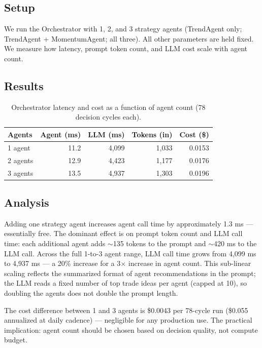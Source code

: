 \documentclass[10pt,conference]{IEEEtran}
\begin{document}
\subsection{Setup}

We run the Orchestrator with 1, 2, and 3 strategy agents (TrendAgent only; TrendAgent + MomentumAgent; all three). All other parameters are held fixed. We measure how latency, prompt token count, and LLM cost scale with agent count.

\subsection{Results}

\begin{table}[h]
    \centering
    \caption{Orchestrator latency and cost as a function of agent count (78 decision cycles each).}
    \begin{tabular}{lrrrr}
        \toprule
        \textbf{Agents} & \textbf{Agent (ms)} & \textbf{LLM (ms)} & \textbf{Tokens (in)} & \textbf{Cost (\$)} \\
        \midrule
        1 agent  & 11.2 & 4,099 & 1,033 & 0.0153 \\
        2 agents & 12.9 & 4,423 & 1,177 & 0.0176 \\
        3 agents & 13.5 & 4,937 & 1,303 & 0.0196 \\
        \bottomrule
    \end{tabular}
    \label{tab:exp2_scaling}
\end{table}

\subsection{Analysis}

Adding one strategy agent increases agent call time by approximately 1.3 ms --- essentially free. The dominant effect is on prompt token count and LLM call time: each additional agent adds $\sim$135 tokens to the prompt and $\sim$420 ms to the LLM call. Across the full 1-to-3 agent range, LLM call time grows from 4,099 ms to 4,937 ms --- a 20\% increase for a 3$\times$ increase in agent count. This sub-linear scaling reflects the summarized format of agent recommendations in the prompt; the LLM reads a fixed number of top trade ideas per agent (capped at 10), so doubling the agents does not double the prompt length.

The cost difference between 1 and 3 agents is \$0.0043 per 78-cycle run (\$0.055 annualized at daily cadence) --- negligible for any production use. The practical implication: agent count should be chosen based on decision quality, not compute budget.
\end{document}
